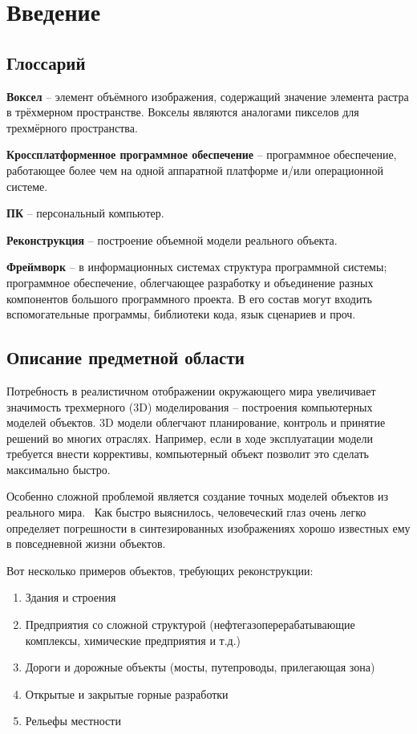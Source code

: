 \section{Введение}

\subsection{Глоссарий}
\textbf{Воксел} -- элемент объёмного изображения, содержащий значение элемента растра в трёхмерном пространстве. Вокселы являются аналогами пикселов для трехмёрного пространства.~\cite{wiki_voxel}

\textbf{Кроссплатформенное программное обеспечение} -- программное обеспечение, работающее более чем на одной аппаратной платформе и/или операционной системе.~\cite{wiki_crossplatfom}

\textbf{ПК} -- персональный компьютер.

\textbf{Реконструкция} -- построение объемной модели реального объекта.

\textbf{Фреймворк} -- в информационных системах структура программной системы; программное обеспечение, облегчающее разработку и объединение разных компонентов большого программного проекта. В его состав могут входить вспомогательные программы, библиотеки кода, язык сценариев и проч.~\cite{wiki_framework}

\subsection{Описание предметной области}
Потребность в реалистичном отображении окружающего мира увеличивает значимость трехмерного (3D) моделирования -- построения компьютерных моделей объектов. 3D модели облегчают планирование, контроль и принятие решений во многих отраслях. Например, если в ходе эксплуатации модели требуется внести коррективы, компьютерный объект позволит это сделать максимально быстро.

Особенно сложной проблемой является создание точных моделей объектов из реального мира.~\cite{komarova_voxel_coloring} Как быстро выяснилось, человеческий глаз очень легко определяет погрешности в синтезированных изображениях хорошо известных ему в повседневной жизни объектов.

Вот несколько примеров объектов, требующих реконструкции:
\begin{enumerate}
\item Здания и строения
\item Предприятия со сложной структурой (нефтегазоперерабатывающие комплексы, химические предприятия и т.д.)
\item Дороги и дорожные объекты (мосты, путепроводы, прилегающая зона)
\item Открытые и закрытые горные разработки
\item Рельефы местности
\end{enumerate}

